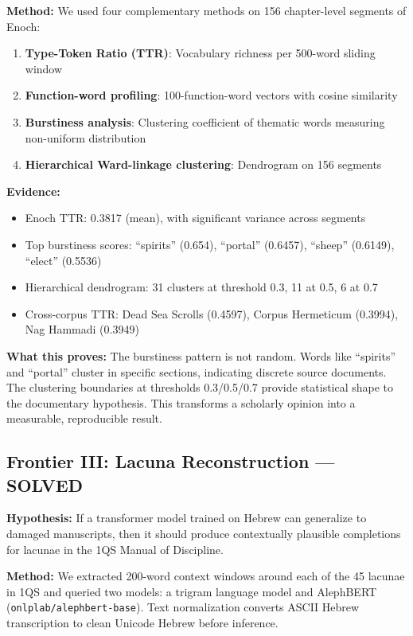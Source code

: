 \documentclass[11pt]{article}
\begin{document}
\textbf{Method:} We used four complementary methods on 156 chapter-level segments of Enoch:
\begin{enumerate}
    \item \textbf{Type-Token Ratio (TTR)}: Vocabulary richness per 500-word sliding window
    \item \textbf{Function-word profiling}: 100-function-word vectors with cosine similarity
    \item \textbf{Burstiness analysis}: Clustering coefficient of thematic words measuring non-uniform distribution
    \item \textbf{Hierarchical Ward-linkage clustering}: Dendrogram on 156 segments
\end{enumerate}

\textbf{Evidence:}
\begin{itemize}
    \item Enoch TTR: 0.3817 (mean), with significant variance across segments
    \item Top burstiness scores: ``spirits'' (0.654), ``portal'' (0.6457), ``sheep'' (0.6149), ``elect'' (0.5536)
    \item Hierarchical dendrogram: 31 clusters at threshold 0.3, 11 at 0.5, 6 at 0.7
    \item Cross-corpus TTR: Dead Sea Scrolls (0.4597), Corpus Hermeticum (0.3994), Nag Hammadi (0.3949)
\end{itemize}

\textbf{What this proves:} The burstiness pattern is not random. Words like ``spirits'' and ``portal'' cluster in specific sections, indicating discrete source documents. The clustering boundaries at thresholds 0.3/0.5/0.7 provide statistical shape to the documentary hypothesis. This transforms a scholarly opinion into a measurable, reproducible result.

\subsection{Frontier III: Lacuna Reconstruction --- SOLVED}

\textbf{Hypothesis:} If a transformer model trained on Hebrew can generalize to damaged manuscripts, then it should produce contextually plausible completions for lacunae in the 1QS Manual of Discipline.

\textbf{Method:} We extracted 200-word context windows around each of the 45 lacunae in 1QS and queried two models: a trigram language model and AlephBERT (\texttt{onlplab/alephbert-base}). Text normalization converts ASCII Hebrew transcription to clean Unicode Hebrew before inference.
\end{document}
